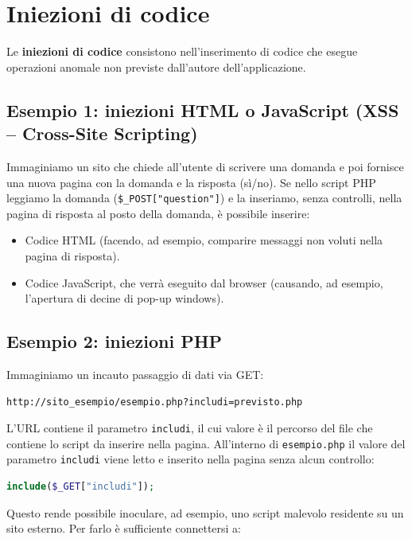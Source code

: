 \section{Iniezioni di codice}

Le \textbf{iniezioni di codice} consistono nell'inserimento di codice che esegue operazioni anomale non previste dall'autore dell'applicazione.

\subsection{Esempio 1: iniezioni HTML o JavaScript (XSS -- Cross-Site Scripting)}

Immaginiamo un sito che chiede all'utente di scrivere una domanda e poi fornisce una nuova pagina con la domanda e la risposta (sì/no). Se nello script PHP leggiamo la domanda (\texttt{\$\_POST["question"]}) e la inseriamo, senza controlli, nella pagina di risposta al posto della domanda, è possibile inserire:

\begin{itemize}
    \item Codice HTML (facendo, ad esempio, comparire messaggi non voluti nella pagina di risposta).
    \item Codice JavaScript, che verrà eseguito dal browser (causando, ad esempio, l'apertura di decine di pop-up windows).
\end{itemize}

\subsection{Esempio 2: iniezioni PHP}

Immaginiamo un incauto passaggio di dati via GET:

\begin{verbatim}
http://sito_esempio/esempio.php?includi=previsto.php
\end{verbatim}

L'URL contiene il parametro \texttt{includi}, il cui valore è il percorso del file che contiene lo script da inserire nella pagina. All'interno di \texttt{esempio.php} il valore del parametro \texttt{includi} viene letto e inserito nella pagina senza alcun controllo:

\begin{lstlisting}[language=PHP]
include($_GET["includi"]);
\end{lstlisting}

Questo rende possibile inoculare, ad esempio, uno script malevolo residente su un sito esterno. Per farlo è sufficiente connettersi a:

